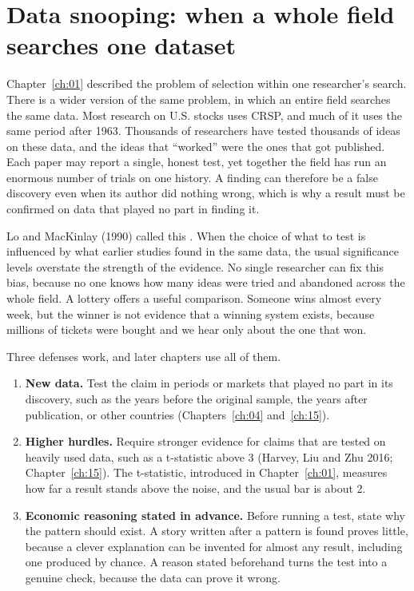 \section{Data snooping: when a whole field searches one dataset}
\label{sec:02-snooping}

Chapter~\ref{ch:01} described the problem of selection within one researcher's search. There is a wider version of the same problem, in which an entire field searches the same data. Most research on U.S. stocks uses CRSP, and much of it uses the same period after 1963. Thousands of researchers have tested thousands of ideas on these data, and the ideas that ``worked'' were the ones that got published. Each paper may report a single, honest test, yet together the field has run an enormous number of trials on one history. A finding can therefore be a false discovery even when its author did nothing wrong, which is why a result must be confirmed on data that played no part in finding it.

Lo and MacKinlay (1990) called this . When the choice of what to test is influenced by what earlier studies found in the same data, the usual significance levels overstate the strength of the evidence. No single researcher can fix this bias, because no one knows how many ideas were tried and abandoned across the whole field. A lottery offers a useful comparison. Someone wins almost every week, but the winner is not evidence that a winning system exists, because millions of tickets were bought and we hear only about the one that won.

Three defenses work, and later chapters use all of them.

\begin{enumerate}
  \item \textbf{New data.} Test the claim in periods or markets that played no part in its discovery, such as the years before the original sample, the years after publication, or other countries (Chapters~\ref{ch:04} and~\ref{ch:15}).
  \item \textbf{Higher hurdles.} Require stronger evidence for claims that are tested on heavily used data, such as a t-statistic above 3 (Harvey, Liu and Zhu 2016; Chapter~\ref{ch:15}). The t-statistic, introduced in Chapter~\ref{ch:01}, measures how far a result stands above the noise, and the usual bar is about 2.
    \item \textbf{Economic reasoning stated in advance.} Before running a test, state why the pattern should exist. A story written after a pattern is found proves little, because a clever explanation can be invented for almost any result, including one produced by chance. A reason stated beforehand turns the test into a genuine check, because the data can prove it wrong.
\end{enumerate}

